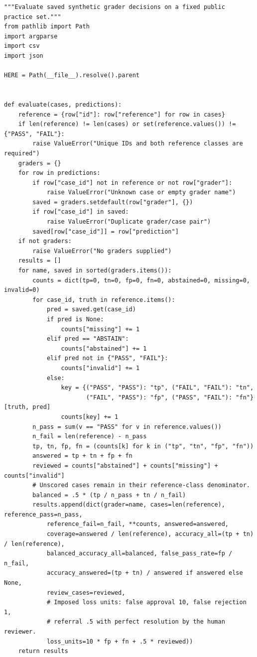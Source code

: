 \begin{Verbatim}[breaklines,breakanywhere,fontsize=\small]
"""Evaluate saved synthetic grader decisions on a fixed public practice set."""
from pathlib import Path
import argparse
import csv
import json

HERE = Path(__file__).resolve().parent


def evaluate(cases, predictions):
    reference = {row["id"]: row["reference"] for row in cases}
    if len(reference) != len(cases) or set(reference.values()) != {"PASS", "FAIL"}:
        raise ValueError("Unique IDs and both reference classes are required")
    graders = {}
    for row in predictions:
        if row["case_id"] not in reference or not row["grader"]:
            raise ValueError("Unknown case or empty grader name")
        saved = graders.setdefault(row["grader"], {})
        if row["case_id"] in saved:
            raise ValueError("Duplicate grader/case pair")
        saved[row["case_id"]] = row["prediction"]
    if not graders:
        raise ValueError("No graders supplied")
    results = []
    for name, saved in sorted(graders.items()):
        counts = dict(tp=0, tn=0, fp=0, fn=0, abstained=0, missing=0, invalid=0)
        for case_id, truth in reference.items():
            pred = saved.get(case_id)
            if pred is None:
                counts["missing"] += 1
            elif pred == "ABSTAIN":
                counts["abstained"] += 1
            elif pred not in {"PASS", "FAIL"}:
                counts["invalid"] += 1
            else:
                key = {("PASS", "PASS"): "tp", ("FAIL", "FAIL"): "tn",
                       ("FAIL", "PASS"): "fp", ("PASS", "FAIL"): "fn"}[truth, pred]
                counts[key] += 1
        n_pass = sum(v == "PASS" for v in reference.values())
        n_fail = len(reference) - n_pass
        tp, tn, fp, fn = (counts[k] for k in ("tp", "tn", "fp", "fn"))
        answered = tp + tn + fp + fn
        reviewed = counts["abstained"] + counts["missing"] + counts["invalid"]
        # Unscored cases remain in their reference-class denominator.
        balanced = .5 * (tp / n_pass + tn / n_fail)
        results.append(dict(grader=name, cases=len(reference), reference_pass=n_pass,
            reference_fail=n_fail, **counts, answered=answered,
            coverage=answered / len(reference), accuracy_all=(tp + tn) / len(reference),
            balanced_accuracy_all=balanced, false_pass_rate=fp / n_fail,
            accuracy_answered=(tp + tn) / answered if answered else None,
            review_cases=reviewed,
            # Imposed loss units: false approval 10, false rejection 1,
            # referral .5 with perfect resolution by the human reviewer.
            loss_units=10 * fp + fn + .5 * reviewed))
    return results



\end{Verbatim}

